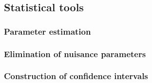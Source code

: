 \subsection{Statistical tools}
\label{S:valor_stat}

\subsubsection{Parameter estimation}

\subsubsection{Elimination of nuisance parameters}

\subsubsection{Construction of confidence intervals}

